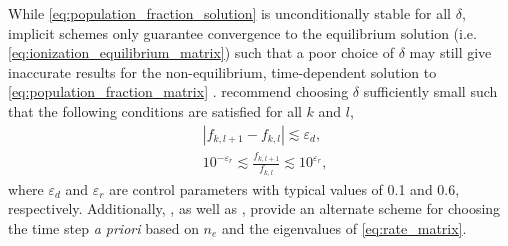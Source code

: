 While \autoref{eq:population_fraction_solution} is unconditionally stable for all $\delta$, implicit schemes only guarantee convergence to the equilibrium solution (i.e. \autoref{eq:ionization_equilibrium_matrix}) such that a poor choice of $\delta$ may still give inaccurate results for the non-equilibrium, time-dependent solution to \autoref{eq:population_fraction_matrix} \citep{bradshaw_numerical_2009}. \citet{macneice_numerical_1984} recommend choosing $\delta$ sufficiently small such that the following conditions are satisfied for all $k$ and $l$,
\begin{align}
    &|f_{k,l+1} - f_{k,l}| \lesssim \varepsilon_d, \\
    &10^{-\varepsilon_r} \lesssim \frac{f_{k,l+1}}{f_{k,l}} \lesssim 10^{\varepsilon_r},
\end{align}
where $\varepsilon_d$ and $\varepsilon_r$ are control parameters with typical values of 0.1 and 0.6, respectively. Additionally, \citet{masai_x-ray_1984}, as well as \citet{shen_lagrangian_2015}, provide an alternate scheme for choosing the time step \textit{a priori} based on $n_e$ and the eigenvalues of \autoref{eq:rate_matrix}.
